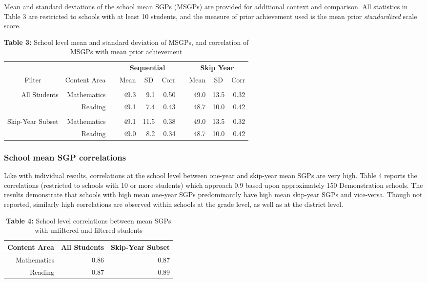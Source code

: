 \documentclass[12pt]{article}
\begin{document}
Mean and standard deviations of the school mean SGPs (MSGPs) are
provided for additional context and comparison. All statistics in Table
3 are restricted to schools with at least 10 students, and the measure
of prior achievement used is the mean prior \emph{standardized} scale
score.

\begin{table}[H]
\caption*{\textbf{Table 3:} School level mean and standard deviation of MSGPs, and correlation of MSGPs with mean prior achievement\label{table3}} 
\begin{center}
\begin{tabular}{rrcrrrcrrr}
\hline\hline
\multicolumn{2}{c}{\bfseries }&\multicolumn{1}{c}{\bfseries }&\multicolumn{3}{c}{\bfseries Sequential}&\multicolumn{1}{c}{\bfseries }&\multicolumn{3}{c}{\bfseries Skip Year}\tabularnewline
\cline{4-6} \cline{8-10}
\multicolumn{1}{c}{Filter}&\multicolumn{1}{c}{Content Area}&\multicolumn{1}{c}{}&\multicolumn{1}{c}{Mean}&\multicolumn{1}{c}{SD}&\multicolumn{1}{c}{Corr}&\multicolumn{1}{c}{}&\multicolumn{1}{c}{Mean}&\multicolumn{1}{c}{SD}&\multicolumn{1}{c}{Corr}\tabularnewline
\hline
&&&&&&&&&\tabularnewline
All Students&Mathematics&&49.3& 9.1&0.50&&49.0&13.5&0.32\tabularnewline
&Reading&&49.1& 7.4&0.43&&48.7&10.0&0.42\tabularnewline
\hline
&&&&&&&&&\tabularnewline
Skip-Year Subset&Mathematics&&49.1&11.5&0.38&&49.0&13.5&0.32\tabularnewline
&Reading&&49.0& 8.2&0.34&&48.7&10.0&0.42\tabularnewline
\hline
\end{tabular}\end{center}
\end{table}

\hypertarget{school-mean-sgp-correlations}{%
\subsubsection{School mean SGP
correlations}\label{school-mean-sgp-correlations}}

Like with individual results, correlations at the school level between
one-year and skip-year mean SGPs are very high. Table 4 reports the
correlations (restricted to schools with 10 or more students) which
approach 0.9 based upon approximately 150 Demonstration schools. The
results demonstrate that schools with high mean one-year SGPs
predominantly have high mean skip-year SGPs and vice-versa. Though not
reported, similarly high correlations are observed within schools at the
grade level, as well as at the district level.

\begin{table}[H]
\caption*{\textbf{Table 4:} School level correlations between mean SGPs with unfiltered and filtered students\label{table4}} 
\begin{center}
\begin{tabular}{rrr}
\hline\hline
\multicolumn{1}{c}{Content Area}&\multicolumn{1}{c}{All Students}&\multicolumn{1}{c}{Skip-Year Subset}\tabularnewline
\hline
Mathematics&0.86&0.87\tabularnewline
Reading&0.87&0.89\tabularnewline
\hline
\end{tabular}\end{center}
\end{table}
\end{document}
